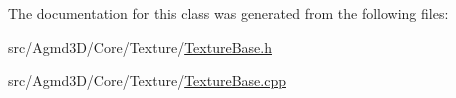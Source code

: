 The documentation for this class was generated from the following files\+:\begin{DoxyCompactItemize}
\item 
src/\+Agmd3\+D/\+Core/\+Texture/\hyperlink{_texture_base_8h}{Texture\+Base.\+h}\item 
src/\+Agmd3\+D/\+Core/\+Texture/\hyperlink{_texture_base_8cpp}{Texture\+Base.\+cpp}\end{DoxyCompactItemize}
